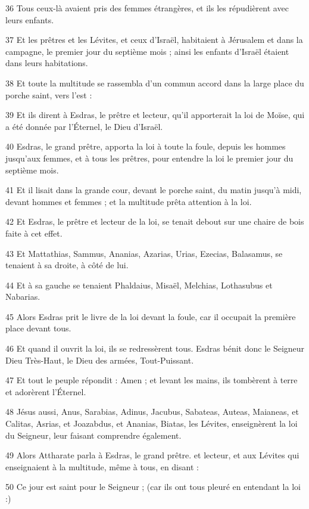 \par 36 Tous ceux-là avaient pris des femmes étrangères, et ils les répudièrent avec leurs enfants.
\par 37 Et les prêtres et les Lévites, et ceux d'Israël, habitaient à Jérusalem et dans la campagne, le premier jour du septième mois ; ainsi les enfants d'Israël étaient dans leurs habitations.
\par 38 Et toute la multitude se rassembla d'un commun accord dans la large place du porche saint, vers l'est :
\par 39 Et ils dirent à Esdras, le prêtre et lecteur, qu'il apporterait la loi de Moïse, qui a été donnée par l'Éternel, le Dieu d'Israël.
\par 40 Esdras, le grand prêtre, apporta la loi à toute la foule, depuis les hommes jusqu'aux femmes, et à tous les prêtres, pour entendre la loi le premier jour du septième mois.
\par 41 Et il lisait dans la grande cour, devant le porche saint, du matin jusqu'à midi, devant hommes et femmes ; et la multitude prêta attention à la loi.
\par 42 Et Esdras, le prêtre et lecteur de la loi, se tenait debout sur une chaire de bois faite à cet effet.
\par 43 Et Mattathias, Sammus, Ananias, Azarias, Urias, Ezecias, Balasamus, se tenaient à sa droite, à côté de lui.
\par 44 Et à sa gauche se tenaient Phaldaius, Misaël, Melchias, Lothasubus et Nabarias.
\par 45 Alors Esdras prit le livre de la loi devant la foule, car il occupait la première place devant tous.
\par 46 Et quand il ouvrit la loi, ils se redressèrent tous. Esdras bénit donc le Seigneur Dieu Très-Haut, le Dieu des armées, Tout-Puissant.
\par 47 Et tout le peuple répondit : Amen ; et levant les mains, ils tombèrent à terre et adorèrent l'Éternel.
\par 48 Jésus aussi, Anus, Sarabias, Adinus, Jacubus, Sabateas, Auteas, Maianeas, et Calitas, Asrias, et Joazabdus, et Ananias, Biatas, les Lévites, enseignèrent la loi du Seigneur, leur faisant comprendre également.
\par 49 Alors Attharate parla à Esdras, le grand prêtre. et lecteur, et aux Lévites qui enseignaient à la multitude, même à tous, en disant :
\par 50 Ce jour est saint pour le Seigneur ; (car ils ont tous pleuré en entendant la loi :)
